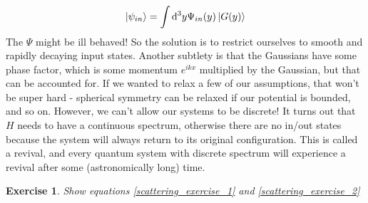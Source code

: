 \documentclass{article}
\newtheorem{exercise}{Exercise}[section]
\begin{document}
\[\ket{\psi_{in}} = \int \dd^3 y \Psi_{in}(y)\ket{G(y)}\]
The $\Psi$ might be ill behaved! So the solution is to restrict ourselves to smooth and rapidly decaying input states. Another subtlety is that the Gaussians have some phase factor, which is some momentum $e^{ikx}$ multiplied by the Gaussian, but that can be accounted for. If we wanted to relax a few of our assumptions, that won't be super hard - spherical symmetry can be relaxed if our potential is bounded, and so on. However, we can't allow our systems to be discrete! It turns out that $H$ needs to have a continuous spectrum, otherwise there are no in/out states because the system will always return to its original configuration. This is called a revival, and every quantum system with discrete spectrum will experience a revival after some (astronomically long) time.
\begin{exercise} Show equations \eqref{scattering_exercise_1} and \eqref{scattering_exercise_2}\end{exercise}
\end{document}
